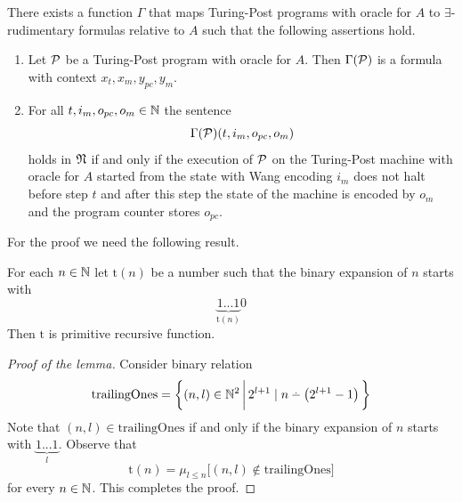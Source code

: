 \documentclass[10pt]{amsart}
\begin{document}
\begin{theorem}\label{theorem:existential_rudimentary_formula_which_describes_execution_of_Turing_Post_program}
	There exists a function $\Gamma$ that maps Turing-Post programs with oracle for $A$ to $\exists$-rudimentary formulas relative to $A$ such that the following assertions hold.
	\begin{enumerate}[label=\emph{\textbf{(\arabic*)}}, leftmargin=3.0em]
		\item Let ${\mathcal P}$ be a Turing-Post program with oracle for $A$. Then $\Gamma({\mathcal P})$ is a formula with context $x_t,x_m,y_{pc},y_m$.
		\item For all $t,i_m,o_{pc},o_m \in {\mathbb N}$ the sentence
		      $$\Gamma({\mathcal P})(t,i_m,o_{pc},o_m)$$
		      holds in ${\mathfrak N}$ if and only if the execution of ${\mathcal P}$ on the Turing-Post machine with oracle for $A$ started from the state with Wang encoding $i_m$ does not halt before step $t$ and after this step the state of the machine is encoded by $o_m$ and the program counter stores $o_{pc}$.
	\end{enumerate}
\end{theorem}
\noindent
For the proof we need the following result.

\begin{lemma}
	For each $n \in {\mathbb N}$ let $\mathrm{t}(n)$ be a number such that the binary expansion of $n$ starts with
	$$\underbrace{1...1}_{\mathrm{t}(n)}0$$
	Then $\mathrm{t}$ is primitive recursive function.
\end{lemma}
\begin{proof}[Proof of the lemma]
	Consider binary relation
	$$\mathrm{trailingOnes} = \bigg\{(n,l)\in \NN^2\,\bigg|\,2^{l+1}\mid n\dotminus \left(2^{l+1} - 1\right)\bigg\}$$
	Note that $(n,l) \in \mathrm{trailingOnes}$ if and only if the binary expansion of $n$ starts with $\underbrace{1...1}_{l}$. Observe that
	$$\mathrm{t}(n) = \mu_{l\leq n}\bigg[(n,l) \not \in \mathrm{trailingOnes}\bigg]$$
	for every $n \in {\mathbb N}$. This completes the proof.
\end{proof}
\end{document}
